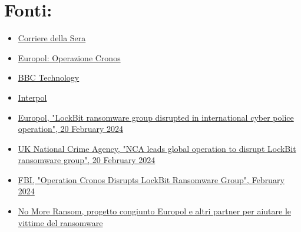 \documentclass[a4paper,12pt]{article}
\begin{document}
\section{Fonti:}
\begin{itemize}
    \item \href{https://www.corriere.it/tecnologia/23_dicembre_19/chi-sono-i-russi-di-lockbit-hacker-che-hanno-bloccato-la-pubblica-amministrazione-politica-contano-solo-i-soldi-695b2492-8908-4e12-993c-5cb23941dxlk.shtml}{Corriere della Sera}
    \item \href{https://www.europol.europa.eu/media-press/newsroom/news/lockbit-ransomware-group-disrupted-in-international-cyber-police-operation}{Europol: Operazione Cronos}
    \item \href{https://www.bbc.com/news/technology-68322223}{BBC Technology}
    \item \href{https://www.interpol.int/en/News-and-Events/News/2024/Global-Operation-Cronos-strikes-Lockbit}{Interpol}
     \item \href{https://www.europol.europa.eu/media-press/newsroom/news/lockbit-ransomware-group-disrupted-in-international-cyber-police-operation}{Europol, "LockBit ransomware group disrupted in international cyber police operation", 20 February 2024}
    \item \href{https://www.nca.gov.uk/news/nca-leads-global-operation-disrupt-lockbit-ransomware-group}{UK National Crime Agency, "NCA leads global operation to disrupt LockBit ransomware group", 20 February 2024}
    \item \href{https://www.fbi.gov/news/stories/lockbit-takedown-february-2024}{FBI, "Operation Cronos Disrupts LockBit Ransomware Group", February 2024}
    \item \href{https://www.nomoreransom.org/en/index.html}{No More Ransom, progetto congiunto Europol e altri partner per aiutare le vittime del ransomware}
\end{itemize}
\end{document}
